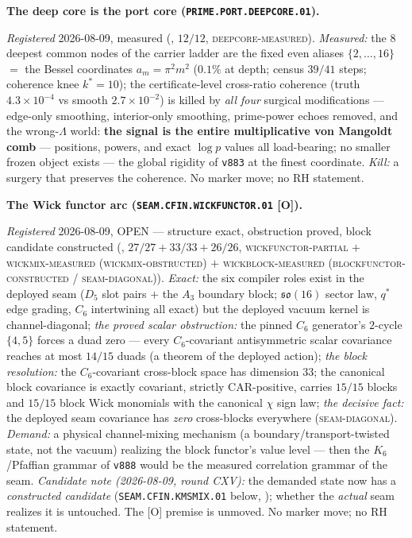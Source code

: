 \documentclass[11pt,a4paper]{article}
\begin{document}
\par\smallskip\noindent\textbf{The deep core is the port core
(\texttt{PRIME.PORT.\allowbreak DEEPCORE.01}).}
{\sloppy
\emph{Registered} 2026-08-09, measured
(, $12/12$,
\textsc{deepcore-measured}).  \emph{Measured:} the $8$ deepest
common nodes of the carrier ladder are the fixed even aliases
$\{2, \dots, 16\}$ $=$ the Bessel coordinates $a_m = \pi^2
m^2$ ($0.1\%$ at depth; census $39/41$ steps; coherence knee
$k^{*} = 10$); the certificate-level cross-ratio coherence
(truth $4.3\times10^{-4}$ vs smooth $2.7\times10^{-2}$) is
killed by \emph{all four} surgical modifications --- edge-only
smoothing, interior-only smoothing, prime-power echoes
removed, and the wrong-$\Lambda$ world: \textbf{the signal is
the entire multiplicative von Mangoldt comb} --- positions,
powers, and exact $\log p$ values all load-bearing; no smaller
frozen object exists --- the global rigidity of \texttt{v883}
at the finest coordinate.  \emph{Kill:} a surgery that
preserves the coherence.  No marker move; no RH
statement.\par}

\par\smallskip\noindent\textbf{The Wick functor arc
(\texttt{SEAM.CFIN.\allowbreak WICKFUNCTOR.01} [O]).}
{\sloppy
\emph{Registered} 2026-08-09, OPEN --- structure exact,
obstruction proved, block candidate constructed
(, $27/27 + 33/33 +
26/26$, \textsc{wickfunctor-partial} $+$
\textsc{wickmix-measured (wickmix-obstructed)} $+$
\textsc{wickblock-measured (blockfunctor-constructed /
seam-diagonal)}).  \emph{Exact:} the six compiler roles exist
in the deployed seam ($D_5$ slot pairs $+$ the $A_3$ boundary
block; $\mathfrak{so}(16)$ sector law, $q^{*}$ edge grading,
$C_6$ intertwining all exact) but the deployed vacuum kernel
is channel-diagonal; \emph{the proved scalar obstruction:} the
pinned $C_6$ generator's $2$-cycle $\{4, 5\}$ forces a duad
zero --- every $C_6$-covariant antisymmetric scalar covariance
reaches at most $14/15$ duads (a theorem of the deployed
action); \emph{the block resolution:} the $C_6$-covariant
cross-block space has dimension $33$; the canonical block
covariance is exactly covariant, strictly CAR-positive,
carries $15/15$ blocks and $15/15$ block Wick monomials with
the canonical $\chi$ sign law; \emph{the decisive fact:} the
deployed seam covariance has \emph{zero} cross-blocks
everywhere (\textsc{seam-diagonal}).  \emph{Demand:} a
physical channel-mixing mechanism (a
boundary/transport-twisted state, not the vacuum) realizing
the block functor's value level --- then the $K_6$/Pfaffian
grammar of \texttt{v888} would be the measured correlation
grammar of the seam.  \emph{Candidate note (2026-08-09, round
CXV):} the demanded state now has a \emph{constructed
candidate} (\texttt{SEAM.CFIN.KMSMIX.01} below,
); whether the \emph{actual}
seam realizes it is untouched.  The [O] premise is unmoved.  No
marker move; no RH statement.\par}
\end{document}
